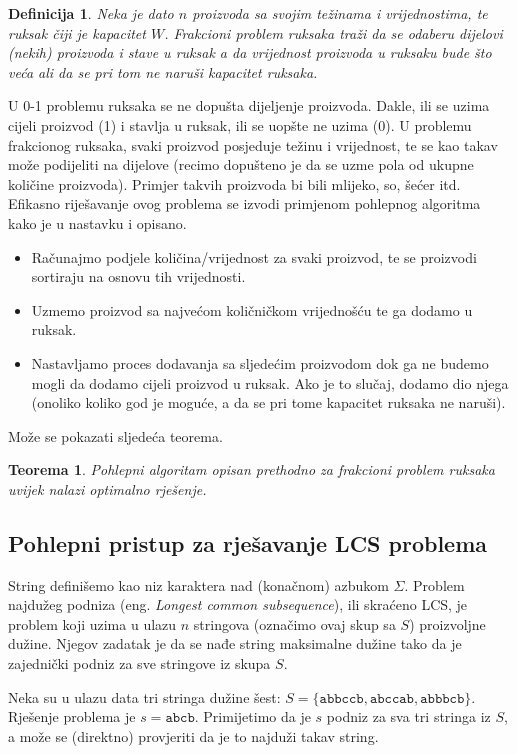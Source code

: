 \documentclass[a4paper, utf8, 11pt, colorlinks]{book}
\newtheorem{definition}{Definicija}[chapter]
\newtheorem{thm}{Teorema}[chapter]
\theoremstyle{definition}
\begin{document}
\begin{definition}
  Neka je dato $n$ proizvoda sa svojim  težinama i vrijednostima, 
  te ruksak čiji je kapacitet $W$. Frakcioni problem ruksaka traži da se odaberu dijelovi   (nekih) proizvoda i stave u ruksak a da vrijednost proizvoda u ruksaku bude što veća ali da se pri tom ne naruši kapacitet ruksaka.
\end{definition}
U 0-1 problemu ruksaka se ne dopušta dijeljenje proizvoda. Dakle, ili se uzima cijeli proizvod (1) i stavlja u ruksak, ili se uopšte ne uzima (0). U  problemu frakcionog ruksaka, svaki proizvod posjeduje težinu i vrijednost, te se kao takav može podijeliti na dijelove (recimo dopušteno je da se uzme   pola od ukupne količine proizvoda). Primjer takvih proizvoda bi bili mlijeko, so, šećer itd. Efikasno riješavanje ovog problema se izvodi primjenom pohlepnog algoritma kako je u nastavku i opisano.
\begin{itemize}
	\item Računajmo podjele količina/vrijednost za svaki proizvod, te se proizvodi  sortiraju na osnovu tih vrijednosti.   \item Uzmemo proizvod sa najvećom količničkom vrijednošću te ga dodamo u ruksak. 
	\item Nastavljamo proces dodavanja sa sljedećim proizvodom dok ga ne budemo mogli da dodamo cijeli proizvod u ruksak.    Ako je to slučaj, dodamo dio njega (onoliko koliko god je moguće, a da se pri tome kapacitet ruksaka ne naruši). 
\end{itemize}
Može se pokazati sljedeća teorema. 

\begin{thm}
      Pohlepni algoritam opisan prethodno za frakcioni problem ruksaka uvijek nalazi optimalno rješenje.
\end{thm}
\subsection{Pohlepni pristup za rješavanje LCS problema}

String definišemo kao niz karaktera nad (konačnom) azbukom $\Sigma$. 
Problem najdužeg podniza (eng. \emph{Longest common subsequence}), ili skraćeno LCS, je problem koji uzima u ulazu  $n$ stringova (označimo ovaj skup sa $S$) proizvoljne dužine. Njegov zadatak je da se nađe string maksimalne dužine tako da je  zajednički podniz za sve stringove iz skupa $S$. 

 Neka su u ulazu data tri stringa dužine šest: $S = \{  \texttt{abbccb}, \texttt{abccab}, \texttt{abbbcb}   \}$. Rješenje problema je $s=\texttt{abcb}$. Primijetimo da je $s$ podniz za sva tri stringa iz $S$, a može se (direktno) provjeriti da je to najduži takav string. 
 
\end{document}
